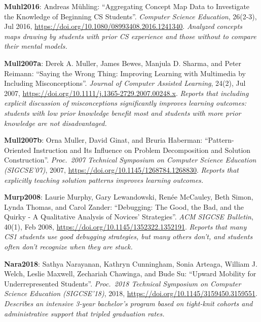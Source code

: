 \textbf{\hypertarget{b:Muhl2016}{Muhl2016}\label{b:Muhl2016}}: Andreas Mühling: ``Aggregating Concept Map Data to Investigate the Knowledge of Beginning CS Students''. \emph{Computer Science Education}, 26(2-3), Jul 2016, \url{https://doi.org/10.1080/08993408.2016.1241340}. \emph{Analyzed concepts maps drawing by students with prior CS experience and those without to compare their mental models.}

\textbf{\hypertarget{b:Mull2007a}{Mull2007a}\label{b:Mull2007a}}: Derek A. Muller, James Bewes, Manjula D. Sharma, and Peter Reimann: ``Saying the Wrong Thing: Improving Learning with Multimedia by Including Misconceptions''. \emph{Journal of Computer Assisted Learning}, 24(2), Jul 2007, \url{https://doi.org/10.1111/j.1365-2729.2007.00248.x}. \emph{Reports that including explicit discussion of misconceptions significantly improves learning outcomes: students with low prior knowledge benefit most and students with more prior knowledge are not disadvantaged.}

\textbf{\hypertarget{b:Mull2007b}{Mull2007b}\label{b:Mull2007b}}: Orna Muller, David Ginat, and Bruria Haberman: ``Pattern-Oriented Instruction and Its Influence on Problem Decomposition and Solution Construction''. \emph{Proc.\ 2007 Technical Symposium on Computer Science Education (SIGCSE'07)}, 2007, \url{https://doi.org/10.1145/1268784.1268830}. \emph{Reports that explicitly teaching solution patterns improves learning outcomes.}

\textbf{\hypertarget{b:Murp2008}{Murp2008}\label{b:Murp2008}}: Laurie Murphy, Gary Lewandowski, Renée McCauley, Beth Simon, Lynda Thomas, and Carol Zander: ``Debugging: The Good, the Bad, and the Quirky - A Qualitative Analysis of Novices' Strategies''. \emph{ACM SIGCSE Bulletin}, 40(1), Feb 2008, \url{https://doi.org/10.1145/1352322.1352191}. \emph{Reports that many CS1 students use good debugging strategies, but many others don't, and students often don't recognize when they are stuck.}

\textbf{\hypertarget{b:Nara2018}{Nara2018}\label{b:Nara2018}}: Sathya Narayanan, Kathryn Cunningham, Sonia Arteaga, William J. Welch, Leslie Maxwell, Zechariah Chawinga, and Bude Su: ``Upward Mobility for Underrepresented Students''. \emph{Proc.\ 2018 Technical Symposium on Computer Science Education (SIGCSE'18)}, 2018, \url{https://doi.org/10.1145/3159450.3159551}. \emph{Describes an intensive 3-year bachelor's program based on tight-knit cohorts and administrative support that tripled graduation rates.}

